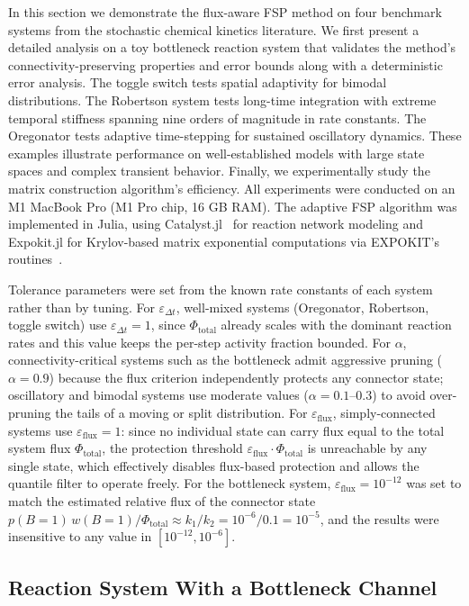 \documentclass[onefignum,onetabnum]{siamart171218}
\begin{document}
In this section we demonstrate the flux-aware FSP method on four benchmark systems from the stochastic chemical kinetics literature. We first present a detailed analysis on a toy bottleneck reaction system that validates the method's connectivity-preserving properties and error bounds along with a deterministic error analysis. The toggle switch tests spatial adaptivity for bimodal distributions. The Robertson system tests long-time integration with extreme temporal stiffness spanning nine orders of magnitude in rate constants. The Oregonator tests adaptive time-stepping for sustained oscillatory dynamics. These examples illustrate performance on well-established models with large state spaces and complex transient behavior. Finally, we experimentally study the matrix construction algorithm's efficiency. All experiments were conducted on an M1 MacBook Pro (M1 Pro chip, 16 GB RAM). The adaptive FSP algorithm was implemented in Julia, using Catalyst.jl~\cite{catalyst2021} for reaction network modeling and Expokit.jl for Krylov-based matrix exponential computations via EXPOKIT's routines~\cite{expokit2021}.

Tolerance parameters were set from the known rate constants of each system rather than by tuning.  For $\varepsilon_{\Delta t}$, well-mixed systems (Oregonator, Robertson, toggle switch) use $\varepsilon_{\Delta t} = 1$, since $\Phi_{\mathrm{total}}$ already scales with the dominant reaction rates and this value keeps the per-step activity fraction bounded.  For $\alpha$, connectivity-critical systems such as the bottleneck admit aggressive pruning ($\alpha = 0.9$) because the flux criterion independently protects any connector state; oscillatory and bimodal systems use moderate values ($\alpha = 0.1$--$0.3$) to avoid over-pruning the tails of a moving or split distribution.  For $\varepsilon_{\mathrm{flux}}$, simply-connected systems use $\varepsilon_{\mathrm{flux}} = 1$: since no individual state can carry flux equal to the total system flux $\Phi_{\mathrm{total}}$, the protection threshold $\varepsilon_{\mathrm{flux}}\cdot\Phi_{\mathrm{total}}$ is unreachable by any single state, which effectively disables flux-based protection and allows the quantile filter to operate freely.  For the bottleneck system, $\varepsilon_{\mathrm{flux}} = 10^{-12}$ was set to match the estimated relative flux of the connector state $p(B{=}1)\,w(B{=}1)/\Phi_{\mathrm{total}} \approx k_1/k_2 = 10^{-6}/0.1 = 10^{-5}$, and the results were insensitive to any value in $[10^{-12}, 10^{-6}]$.

\subsection{Reaction System With a Bottleneck Channel}
\end{document}
